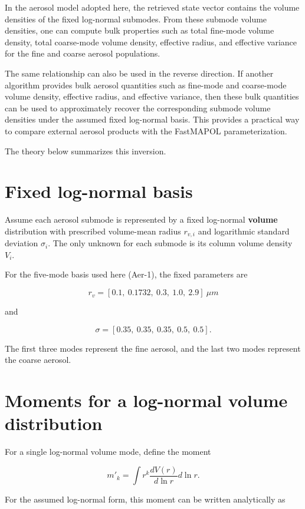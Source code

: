 \documentclass[
  11pt,
  letterpaper,
]{scrreprt}
\begin{document}
In the aerosol model adopted here, the retrieved state vector contains
the volume densities of the fixed log-normal submodes. From these
submode volume densities, one can compute bulk properties such as total
fine-mode volume density, total coarse-mode volume density, effective
radius, and effective variance for the fine and coarse aerosol
populations.

The same relationship can also be used in the reverse direction. If
another algorithm provides bulk aerosol quantities such as fine-mode and
coarse-mode volume density, effective radius, and effective variance,
then these bulk quantities can be used to approximately recover the
corresponding submode volume densities under the assumed fixed
log-normal basis. This provides a practical way to compare external
aerosol products with the FastMAPOL parameterization.

The theory below summarizes this inversion.

\section{Fixed log-normal basis}\label{fixed-log-normal-basis}

Assume each aerosol submode is represented by a fixed log-normal
\textbf{volume} distribution with prescribed volume-mean radius
\(r_{v,i}\) and logarithmic standard deviation \(\sigma_i\). The only
unknown for each submode is its column volume density \(V_i\).

For the five-mode basis used here (Aer-1), the fixed parameters are

\[
r_v = [0.1,\ 0.1732,\ 0.3,\ 1.0,\ 2.9] \ \mu m
\]

and

\[
\sigma = [0.35,\ 0.35,\ 0.35,\ 0.5,\ 0.5].
\]

The first three modes represent the fine aerosol, and the last two modes
represent the coarse aerosol.

\section{Moments for a log-normal volume
distribution}\label{moments-for-a-log-normal-volume-distribution}

For a single log-normal volume mode, define the moment

\[
m'_k = \int r^k \frac{dV(r)}{d\ln r} d\ln r.
\]

For the assumed log-normal form, this moment can be written analytically
as
\end{document}

